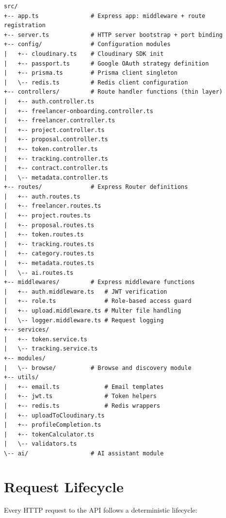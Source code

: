 \begin{lstlisting}[caption={Backend Directory Structure}]
src/
+-- app.ts               # Express app: middleware + route registration
+-- server.ts            # HTTP server bootstrap + port binding
+-- config/              # Configuration modules
|   +-- cloudinary.ts    # Cloudinary SDK init
|   +-- passport.ts      # Google OAuth strategy definition
|   +-- prisma.ts        # Prisma client singleton
|   \-- redis.ts         # Redis client configuration
+-- controllers/         # Route handler functions (thin layer)
|   +-- auth.controller.ts
|   +-- freelancer-onboarding.controller.ts
|   +-- freelancer.controller.ts
|   +-- project.controller.ts
|   +-- proposal.controller.ts
|   +-- token.controller.ts
|   +-- tracking.controller.ts
|   +-- contract.controller.ts
|   \-- metadata.controller.ts
+-- routes/              # Express Router definitions
|   +-- auth.routes.ts
|   +-- freelancer.routes.ts
|   +-- project.routes.ts
|   +-- proposal.routes.ts
|   +-- token.routes.ts
|   +-- tracking.routes.ts
|   +-- category.routes.ts
|   +-- metadata.routes.ts
|   \-- ai.routes.ts
+-- middlewares/         # Express middleware functions
|   +-- auth.middleware.ts   # JWT verification
|   +-- role.ts              # Role-based access guard
|   +-- upload.middleware.ts # Multer file handling
|   \-- logger.middleware.ts # Request logging
+-- services/
|   +-- token.service.ts
|   \-- tracking.service.ts
+-- modules/
|   \-- browse/          # Browse and discovery module
+-- utils/
|   +-- email.ts             # Email templates
|   +-- jwt.ts               # Token helpers
|   +-- redis.ts             # Redis wrappers
|   +-- uploadToCloudinary.ts
|   +-- profileCompletion.ts
|   +-- tokenCalculator.ts
|   \-- validators.ts
\-- ai/                  # AI assistant module
\end{lstlisting}

\section{Request Lifecycle}

Every HTTP request to the \projectname{} API follows a deterministic lifecycle:

